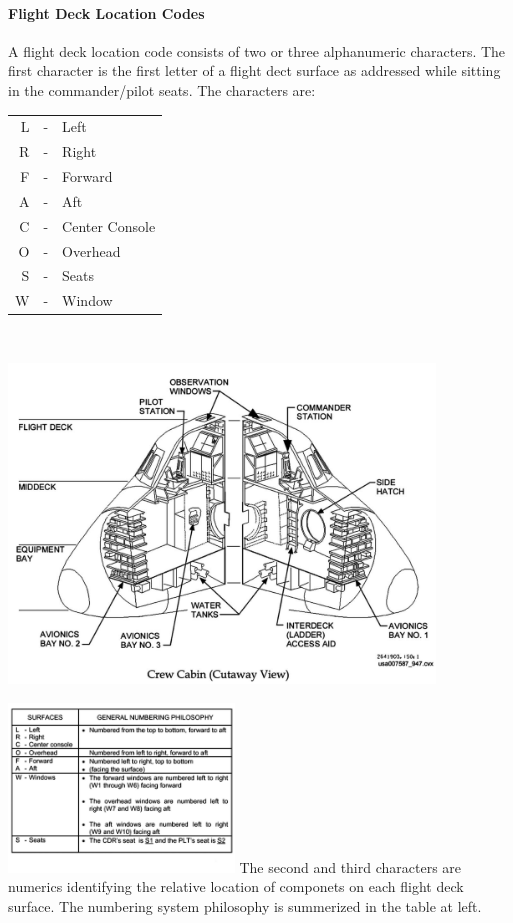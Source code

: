 \documentclass[13pt]{article}
\begin{document}
\begin{multicols}{2}
\paragraph{Flight Deck Location Codes}
A flight deck location code consists of two or three alphanumeric characters. The first character is the first letter of a flight dect surface as addressed while sitting in the commander/pilot seats. The characters are:
\\
\begin{tabular}{r c l}
	L& - &Left\\
	R& - &Right\\
	F &-& Forward\\
	A &-& Aft\\
	C &- &Center Console\\
	O &-& Overhead\\
	S &-& Seats\\
	W &-& Window\\
\end{tabular}
\\
\end{multicols}
\includegraphics[width=0.85\textwidth]{Crew Cabin (Cutaway).jpg}
\begin{multicols}{2}
\includegraphics[width=0.45\textwidth]{FD_Codes_Chart.jpg}
The second and third characters are numerics identifying the relative location of componets on each flight deck surface. The numbering system philosophy is summerized in the table at left.
\\
\end{multicols}
\end{document}
